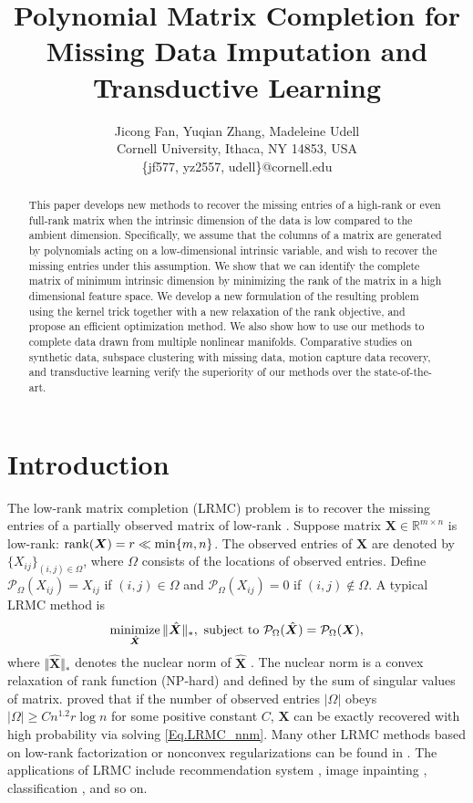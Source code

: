\documentclass[letterpaper]{article} %
\title{Polynomial Matrix Completion for\\ Missing Data Imputation and Transductive Learning}
\author{Jicong Fan, Yuqian Zhang, Madeleine Udell\\
Cornell University, Ithaca, NY 14853, USA\\
\{jf577, yz2557, udell\}@cornell.edu
}
\begin{document}
\maketitle

\begin{abstract}
This paper develops new methods to recover the missing entries of
a high-rank or even full-rank matrix
when the intrinsic dimension of the data is low compared to the ambient dimension.
Specifically, we assume that the columns of a matrix are generated
by polynomials acting on a low-dimensional intrinsic variable,
and wish to recover the missing entries under this assumption.
We show that we can identify the complete matrix of minimum intrinsic dimension
by minimizing the rank of the matrix in a high dimensional feature space.
We develop a new formulation of the resulting problem
using the kernel trick together with a new relaxation of the rank objective,
and propose an efficient optimization method.
We also show how to use our methods to complete data drawn from multiple nonlinear manifolds.
Comparative studies on synthetic data, subspace clustering with missing data,
motion capture data recovery, and transductive learning verify the superiority of our methods over the state-of-the-art.
\end{abstract}


\section{Introduction}
The low-rank matrix completion (LRMC) problem is to recover the missing entries of a partially observed matrix of low-rank  \cite{CandesRecht2009}.
Suppose matrix $\bm{X}\in\mathbb{R}^{m\times n}$ is low-rank: $\textup{rank}(\bm{X})=r\ll \min\lbrace m,n\rbrace$. The observed entries of $\bm{X}$ are denoted by $\lbrace X_{ij}\rbrace_{(i,j)\in\Omega}$, where $\Omega$ consists of the locations of observed entries. Define $\mathcal{P}_{\Omega}(X_{ij})=X_{ij}$ if $(i,j)\in\Omega$ and $\mathcal{P}_{\Omega}(X_{ij})=0$ if $(i,j)\notin\Omega$. A typical LRMC method is
\begin{equation}\label{Eq.LRMC_nnm}
\mathop{\text{minimize}}_{\hat{\bm{X}}}\Vert\hat{\bm{X}}\Vert_\ast,\ \textup{subject to}\ \mathcal{P}_{\Omega}(\hat{\bm{X}})=\mathcal{P}_{\Omega}(\bm{X}),
\end{equation}
where $\Vert\hat{\bm{X}}\Vert_\ast$ denotes the nuclear norm of $\hat{\bm{X}}$ . The nuclear norm is a convex relaxation of rank function (NP-hard) and defined by the sum of singular values of matrix.
\cite{CandesRecht2009} proved that if the number of observed entries $\vert\Omega\vert$ obeys $\vert\Omega\vert\geq Cn^{1.2}r\log n$ for some positive constant $C$, $\bm{X}$ can be exactly recovered with high probability via solving \eqref{Eq.LRMC_nnm}.
Many other LRMC methods based on low-rank factorization or nonconvex regularizations can be found in \cite{MC_MF_Wen2012,MC_TNNR_PAMI2013,MC_ShattenP_AAAI125165,gu2014weighted,MC_IRRN,icml2014c2_wanga14,mu2016scalable,xie2016weighted,sun2016guaranteed}. The applications of LRMC include recommendation system \cite{Su:2009:SCF:1592474.1722966}, image inpainting \cite{imageinpainting2014}, classification \cite{NIPS2010_3932}, and so on.
\end{document}
